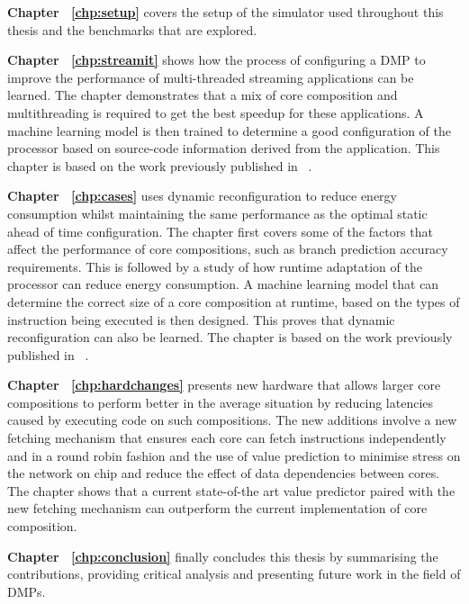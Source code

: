 \textbf{Chapter ~\ref{chp:setup}} covers the setup of the simulator used throughout this thesis and the benchmarks that are explored.

\textbf{Chapter ~\ref{chp:streamit}} shows how the process of configuring a DMP to improve the performance of multi-threaded streaming applications can be learned.
The chapter demonstrates that a mix of core composition and multithreading is required to get the best speedup for these applications.
A machine learning model is then trained to determine a good configuration of the processor based on source-code information derived from the application.
This chapter is based on the work previously published in ~\cite{micolet2016dmpstream}.

\textbf{Chapter ~\ref{chp:cases}} uses dynamic reconfiguration to reduce energy consumption whilst maintaining the same performance as the optimal static ahead of time configuration.
The chapter first covers some of the factors that affect the performance of core compositions, such as branch prediction accuracy requirements.
This is followed by a study of how runtime adaptation of the processor can reduce energy consumption.
A machine learning model that can determine the correct size of a core composition at runtime, based on the types of instruction being executed is then designed.
This proves that dynamic reconfiguration can also be learned.
The chapter is based on the work previously published in ~\cite{micolet2017cases}.

\textbf{Chapter ~\ref{chp:hardchanges}} presents new hardware that allows larger core compositions to perform better in the average situation by reducing latencies caused by executing code on such compositions.
The new additions involve a new fetching mechanism that ensures each core can fetch instructions independently and in a round robin fashion and the use of value prediction to minimise stress on the network on chip and reduce the effect of data dependencies between cores.
The chapter shows that a current state-of-the art value predictor paired with the new fetching mechanism can outperform the current implementation of core composition.

\textbf{Chapter ~\ref{chp:conclusion}} finally concludes this thesis by summarising the contributions, providing critical analysis and presenting future work in the field of DMPs.